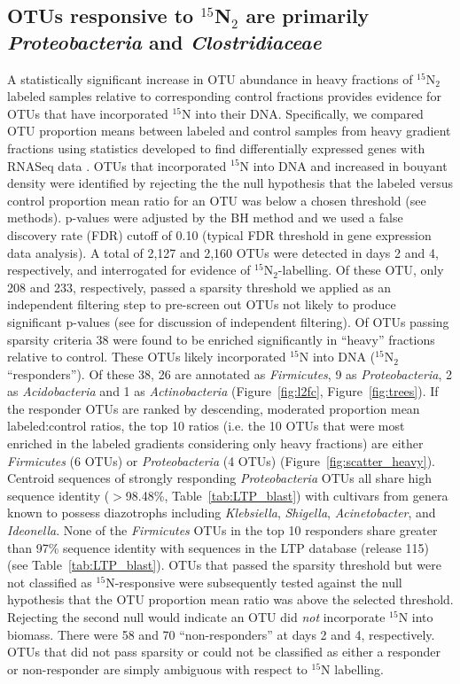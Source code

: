 \subsection{OTUs responsive to $^{15}$N$_{2}$ are primarily \textit{Proteobacteria}
and \textit{Clostridiaceae}}
A statistically significant increase in OTU abundance in heavy fractions of
$^{15}$N$_{2}$ labeled samples relative to corresponding control fractions
provides evidence for OTUs that have incorporated $^{15}$N into their DNA.
Specifically, we compared OTU proportion means between labeled and
control samples from heavy gradient fractions using statistics developed to
find differentially expressed genes with RNASeq data \citep{24699258,
Love_2014}. OTUs that incorporated $^{15}$N into DNA and increased in bouyant
density were identified by rejecting the the null hypothesis that the labeled
versus control proportion mean ratio for an OTU was below a chosen
threshold (see methods). p-values were adjusted by the BH method
\citep{citeulike:1042553} and we used a false discovery rate (FDR) cutoff of
0.10 (typical FDR threshold in gene expression data analysis). A total of 2,127
and 2,160 OTUs were detected in days 2 and 4, respectively, and interrogated
for evidence of $^{15}$N$_{2}$-labelling. Of these OTU, only 208
and 233, respectively, passed a sparsity threshold we applied as an independent
filtering step to pre-screen out OTUs not likely to produce significant
p-values (see \citet{Love_2014} for discussion of independent filtering). Of OTUs
passing sparsity criteria 38 were found to be enriched significantly in
``heavy'' fractions relative to control. These OTUs likely incorporated
$^{15}$N into DNA ($^{15}$N$_{2}$ ``responders''). Of these 38, 26 are
annotated as \textit{Firmicutes}, 9 as \textit{Proteobacteria}, 2 as
\textit{Acidobacteria} and 1 as \textit{Actinobacteria} (Figure~\ref{fig:l2fc},
Figure~\ref{fig:trees}). If the responder OTUs are ranked by descending,
moderated proportion mean labeled:control ratios, the top 10 ratios (i.e. the
10 OTUs that were most enriched in the labeled gradients considering only heavy
fractions) are either \textit{Firmicutes} (6 OTUs) or \textit{Proteobacteria}
(4 OTUs) (Figure~\ref{fig:scatter_heavy}). Centroid sequences of
strongly responding \textit{Proteobacteria} OTUs all share high sequence identity
($>$98.48\%, Table~\ref{tab:LTP_blast}) with cultivars from genera
known to possess diazotrophs including \textit{Klebsiella}, \textit{Shigella},
\textit{Acinetobacter}, and \textit{Ideonella}. None of the \textit{Firmicutes}
OTUs in the top 10 responders share greater than 97\% sequence identity with
sequences in the LTP database (release 115) (see Table~\ref{tab:LTP_blast}).
OTUs that passed the sparsity threshold but were not classified as
$^{15}$N-responsive were subsequently tested against the null hypothesis that
the OTU proportion mean ratio was above the selected threshold. Rejecting the
second null would indicate an OTU did \textit{not} incorporate $^{15}$N into
biomass. There were 58 and 70 ``non-responders'' at days 2 and 4,
respectively. OTUs that did not pass sparsity or could not be classified as
either a responder or non-responder are simply ambiguous with respect to
$^{15}$N labelling.
